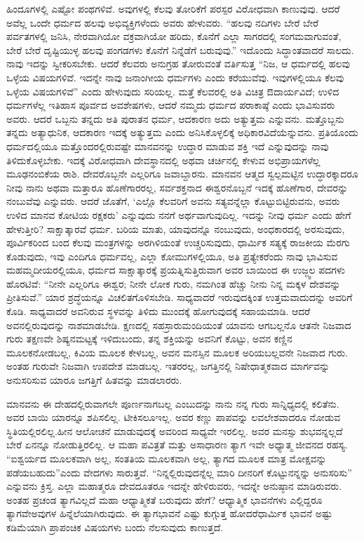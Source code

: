 ಹಿಂದೂಗಳಲ್ಲಿ ಎಷ್ಟೋ ಪಂಥಗಳಿವೆ. ಅವುಗಳಲ್ಲಿ ಕೆಲವು ತೋರಿಕೆಗೆ ಪರಸ್ಪರ ವಿರೋಧವಾಗಿ ಕಾಣುವುವು. ಆದರೆ ಅವೆಲ್ಲ ಒಂದೇ ಧರ್ಮದ ಹಲವು ಅಭಿವ್ಯಕ್ತಿಗಳೆಂದು ಅವರು ಹೇಳುವರು. “ಹಲವು ನದಿಗಳು ಬೇರೆ ಬೇರೆ ಪರ್ವತಗಳಲ್ಲಿ ಜನಿಸಿ, ನೇರವಾಗಿಯೋ ವಕ್ರವಾಗಿಯೋ ಹರಿದು, ಕೊನೆಗೆ ಎಲ್ಲಾ ಸಾಗರದಲ್ಲಿ ಸಂಗಮವಾಗುವಂತೆ, ಬೇರೆ ಬೇರೆ ದೃಷ್ಟಿಯುಳ್ಳ ಹಲವು ಪಂಗಡಗಳು ಕೊನೆಗೆ ನಿನ್ನೆಡೆಗೆ ಬರುವುವು.” ಇದೊಂದು ಸಿದ್ಧಾಂತವಾದರೆ ಸಾಲದು. ನಾವು ಇದನ್ನು ಸ್ವೀಕರಿಸಬೇಕು. ಆದರೆ ಕೆಲವರು ಅನುಗ್ರಹ ತೋರುವಂತೆ ವರ್ತಿಸುತ್ತ “ನಿಜ, ಆ ಧರ್ಮದಲ್ಲಿ ಹಲವು ಒಳ್ಳೆಯ ವಿಷಯಗಳಿವೆ. ಇದನ್ನೇ ನಾವು ಜನಾಂಗೀಯ ಧರ್ಮಗಳು ಎಂದು ಕರೆಯುವೆವು. ಇವುಗಳಲ್ಲಿಯೂ ಕೆಲವು ಒಳ್ಳೆಯ ವಿಷಯಗಳಿವೆ” ಎಂದು ಹೇಳುವುದು ಸರಿಯಲ್ಲ. ಮತ್ತೆ ಕೆಲವರಲ್ಲಿ ಅತಿ ವಿಚಿತ್ರ ಔದಾರ್ಯವಿದೆ; ಉಳಿದ ಧರ್ಮಗಳೆಲ್ಲ ಇತಿಹಾಸ ಪೂರ್ವದ ಅವಶೇಷಗಳು, ಆದರೆ ನಮ್ಮದು ಧರ್ಮದ ಪರಾಕಾಷ್ಠೆ ಎಂದು ಭಾವಿಸುವರು ಅವರು. ಆದರೆ ಒಬ್ಬನು ತನ್ನದು ಅತಿ ಪುರಾತನ ಧರ್ಮ, ಆದಕಾರಣ ಅದು ಅತ್ಯುತ್ತಮ ಎನ್ನುವನು. ಮತ್ತೊಬ್ಬನು ತನ್ನದು ಅತ್ಯಾಧುನಿಕ, ಆದಕಾರಣ ಇದಕ್ಕೆ ಅತ್ಯುತ್ತಮ ಎಂದು ಅನಿಸಿಕೊಳ್ಳಲಿಕ್ಕೆ ಅಧಿಕಾರವಿದೆಯೆನ್ನುವನು. ಪ್ರತಿಯೊಂದು ಧರ್ಮದಲ್ಲಿಯೂ ಮತ್ತೊಂದರಲ್ಲಿರುವಷ್ಟೇ ಮಾನವನನ್ನು ಉದ್ಧಾರ ಮಾಡುವ ಶಕ್ತಿ ಇದೆ ಎನ್ನುವುದನ್ನು ನಾವು ತಿಳಿದುಕೊಳ್ಳಬೇಕು. ಇದಕ್ಕೆ ವಿರೋಧವಾಗಿ ದೇವಸ್ಥಾನದಲ್ಲಿ ಅಥವಾ ಚರ್ಚಿನಲ್ಲಿ ಕೇಳುವ ಅಭಿಪ್ರಾಯಗಳೆಲ್ಲ ಮೂಢನಂಬಿಕೆಯ ರಾಶಿ. ದೇವರೊಬ್ಬನೇ ಎಲ್ಲರಿಗೂ ಜವಾಬ್ದಾರನು. ಮಾನವನ ಆತ್ಮದ ಸ್ವಲ್ಪಮಟ್ಟಿನ ಉದ್ಧಾರಕ್ಕಾದರೂ ನೀವು ನಾನು ಅಥವಾ ಮತ್ತಾರೂ ಹೊಣೆಗಾರರಲ್ಲ, ಸರ್ವಶಕ್ತನಾದ ಈಶ್ವರನೊಬ್ಬನೆ ಇದಕ್ಕೆ ಹೊಣೆಗಾರ, ದೇವರನ್ನು ನಂಬುವೆವು ಎನ್ನುವರು. ಆದರೆ ಜೊತೆಗೆ, ‘ಎಲ್ಲೊ ಕೆಲವರಿಗೆ ಅವನು ಸತ್ಯವನ್ನೆಲ್ಲಾ ಕೊಟ್ಟುಬಿಟ್ಟಿರುವನು, ಅವರು ಉಳಿದ ಮಾನವ ಕೋಟಿಯ ರಕ್ಷಕರು’ ಎನ್ನುವುದು ನನಗೆ ಅರ್ಥವಾಗುವುದಿಲ್ಲ. ಇದನ್ನು ನೀವು ಧರ್ಮ ಎಂದು ಹೇಗೆ ಹೇಳುತ್ತೀರಿ? ಸಾಕ್ಷಾತ್ಕಾರವೆ ಧರ್ಮ. ಬರಿಯ ಮಾತು, ಯಾವುದನ್ನೊ ನಂಬುವುದು, ಅಂಧಕಾರದಲ್ಲಿ ಅರಸುವುದು, ಪೂರ್ವಿಕರಿಂದ ಬಂದ ಕೆಲವು ಮಂತ್ರಗಳನ್ನು ಅರಗಿಳಿಯಂತೆ ಉಚ್ಚರಿಸುವುದು, ಧಾರ್ಮಿಕ ಸತ್ಯಕ್ಕೆ ರಾಜಕೀಯ ಮೆರಗು ಕೊಡುವುದು, ಇವು ಎಂದಿಗೂ ಧರ್ಮವಲ್ಲ, ಎಲ್ಲಾ ಕೋಮುಗಳಲ್ಲಿಯೂ, ಅತಿ ಪ್ರತ್ಯೇಕರೆಂದು ನಾವು ಭಾವಿಸುವ ಮಹಮ್ಮದೀಯರಲ್ಲಿಯೂ, ಧರ್ಮದ ಸಾಕ್ಷಾತ್ಕಾರಕ್ಕೆ ಪ್ರಯತ್ನಿಸುತ್ತಿರುವಾಗ ಅವರ ಬಾಯಿಂದ ಈ ಉಜ್ಜ್ವಲ ಪದಗಳು ಹೊರಟಿವೆ: “ನೀನೇ ಎಲ್ಲರಿಗೂ ಈಶ್ವರ; ನೀನೇ ಲೋಕ ಗುರು, ನಮಗಿಂತ ಹೆಚ್ಚು ನೀನು ನಿನ್ನ ಮಕ್ಕಳ ದೇಶವನ್ನು ಪ್ರೀತಿಸುವೆ.” ಯಾರ ಶ್ರದ್ಧೆಯನ್ನೂ ವಿಚಲಿತಗೊಳಿಸಬೇಡಿ. ಸಾಧ್ಯವಾದರೆ ಇರುವುದಕ್ಕಿಂತ ಉತ್ತಮವಾದುದನ್ನು ಅವರಿಗೆ ಕೊಡಿ. ಸಾಧ್ಯವಾದರೆ ಅವನಿರುವ ಸ್ಥಳವನ್ನು ತಿಳಿದು ಮುಂದಕ್ಕೆ ಹೋಗುವುದಕ್ಕೆ ಸಹಾಯಮಾಡಿ. ಆದರೆ ಅವನಲ್ಲಿರುವುದನ್ನು ನಾಶಮಾಡಬೇಡಿ. ಕ್ಷಣದಲ್ಲಿ ಸಹಸ್ರಾರು\break ಮಂದಿಯಂತೆ ಯಾವನು ಆಗಬಲ್ಲನೊ ಆತನೇ ನಿಜವಾದ ಗುರು ತಕ್ಷಣವೇ ಶಿಷ್ಯನ\break ಮಟ್ಟಕ್ಕೆ ಇಳಿದುಬಂದು, ತನ್ನ ಶಕ್ತಿಯನ್ನು ಅವನಿಗೆ ಕೊಟ್ಟು, ಅವನ ಕಣ್ಣಿನ ಮೂಲಕ\break ನೋಡಬಲ್ಲ, ಕಿವಿಯ ಮೂಲಕ ಕೇಳಬಲ್ಲ, ಅವನ ಮನಸ್ಸಿನ ಮೂಲಕ ಅರಿಯಬಲ್ಲವನೇ ನಿಜವಾದ ಗುರು. ಅಂತಹ ಗುರುವೇ ನಿಜವಾಗಿ ಉಪದೇಶ ಮಾಡಬಲ್ಲ. ಇತರರಲ್ಲ, ಜಗತ್ತಿನಲ್ಲಿ ನಿಷೇಧಾತ್ಮಕವಾದ ಮಾರ್ಗವನ್ನು ಅನುಸರಿಸುವ ಯಾರೂ ಜಗತ್ತಿಗೆ ಹಿತವನ್ನು ಮಾಡಲಾರರು.

ಮಾನವನು ಈ ದೇಹದಲ್ಲಿರುವಾಗಲೇ ಪೂರ್ಣನಾಗಬಲ್ಲ ಎಂಬುದನ್ನು ನಾನು ನನ್ನ ಗುರು ಸಾನ್ನಿಧ್ಯದಲ್ಲಿ ಕಲಿತೆನು. ಅವರ ಬಾಯಿ ಯಾರನ್ನೂ ಶಪಿಸಲಿಲ್ಲ. ಟೀಕಿಸಲೂ\break ಇಲ್ಲ. ಅವರ ಕಣ್ಣು ಪಾಪವನ್ನು ಲವಲೇಶವಾದರೂ ನೋಡುವ ಸ್ಥಿತಿಯಲ್ಲಿರಲಿಲ್ಲ.\break ಹೀನ ಆಲೋಚನೆ ಮಾಡುವುದಕ್ಕೆ ಅವರಿಂದ ಸಾಧ್ಯವೇ ಇರಲಿಲ್ಲ. ಅವರ ಮನಸ್ಸು ಶುಭವನ್ನಲ್ಲದೆ ಬೇರೆ ಏನನ್ನೂ ನೋಡುತ್ತಿರಲಿಲ್ಲ. ಆ ಮಹಾ ಪವಿತ್ರತೆ ಮತ್ತು ಅಸಾಧಾರಣ ತ್ಯಾಗ ಇವೇ ಅಧ್ಯಾತ್ಮ ಜೀವನದ ರಹಸ್ಯ. “ಐಶ್ವರ್ಯದ ಮೂಲಕವಾಗಿ ಅಲ್ಲ, ಸಂತತಿಯ ಮೂಲಕವಾಗಿ ಅಲ್ಲ, ತ್ಯಾಗದ ಮೂಲಕ ಮಾತ್ರ ಮೋಕ್ಷವನ್ನು ಪಡೆಯಬಹುದು”\break ಎಂದು ವೇದಗಳು ಸಾರುತ್ತವೆ. “ನಿನ್ನಲ್ಲಿರುವುದನ್ನೆಲ್ಲ ಮಾರಿ ದೀನರಿಗೆ ಕೊಟ್ಟು\break ನನ್ನನ್ನು ಅನುಸರಿಸು” ಎನ್ನುವನು ಕ್ರಿಸ್ತ. ಎಲ್ಲಾ ಮಹಾತ್ಮರೂ ದೇವದೂತರೂ ಇದನ್ನೇ ಹೇಳಿರುವರು, ಇದನ್ನೇ ಅನುಷ್ಠಾನ ಮಾಡಿರುವರು. ಅಂತಹ ಪ್ರಚಂಡ ತ್ಯಾಗವಿಲ್ಲದೆ ಮಹಾ ಆಧ್ಯಾತ್ಮಿಕತೆ ಬರುವುದು ಹೇಗೆ? ಆಧ್ಯಾತ್ಮಿಕ ಭಾವನೆಗಳು ಎಲ್ಲಿದ್ದರೂ ತ್ಯಾಗವೇ\break ಅವುಗಳ ಹಿನ್ನೆಲೆಯಾಗಿರುವುದು. ಈ ತ್ಯಾಗಭಾವನೆ ಎಷ್ಟು ಕುಗ್ಗುತ್ತ ಹೋದರೆ\break ಧಾರ್ಮಿಕ ಭಾವನೆ ಅಷ್ಟು ಕಡಿಮೆಯಾಗಿ ಪ್ರಾಪಂಚಿಕ ವಿಷಯಗಳು ಬಂದು ನೆಲಸುವುದು ಕಾಣುತ್ತದೆ.

